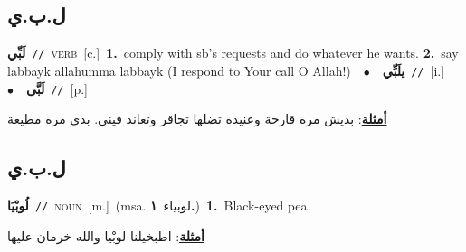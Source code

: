 \documentclass[10pt,a4paper,twoside]{article} %
\begin{document}
\begin{multicols}{2}
{{{{{{{{{{{{{\vspace{-3mm}
\subsection*{\color{blue}\foreignlanguage{arabic}{ل.ب.ي}\color{blue}{}} 

{\setlength\topsep{0pt}\textbf{\foreignlanguage{arabic}{لَبِّي}}\ {\color{gray}\texttt{//}\color{black}}\ \textsc{verb}\ [c.]\ \textbf{1.}~comply with sb's requests and do whatever he wants.  \textbf{2.}~say  labbayk allahumma labbayk (I respond to Your call O Allah!)\ \ $\bullet$\ \ \setlength\topsep{0pt}\textbf{\foreignlanguage{arabic}{يلَبِّي}}\ {\color{gray}\texttt{//}\color{black}}\ [i.]\ \ $\bullet$\ \ \setlength\topsep{0pt}\textbf{\foreignlanguage{arabic}{لَبَّى}}\ {\color{gray}\texttt{//}\color{black}}\ [p.]\  \begin{flushright}\color{gray}\foreignlanguage{arabic}{\textbf{\underline{\foreignlanguage{arabic}{أمثلة}}}: بديش مرة قارحة وعنيدة تضلها تجاقر وتعاند فيني. بدي مرة مطيعة}\end{flushright}\color{black}} \vspace{2mm}

\vspace{-3mm}
\subsection*{\color{blue}\foreignlanguage{arabic}{ل.ب.ي}\color{blue}{ (ntws)}} 

{\setlength\topsep{0pt}\textbf{\foreignlanguage{arabic}{لُوبْيَا}}\ {\color{gray}\texttt{//}\color{black}}\ \textsc{noun}\ [m.]\ \color{gray}(msa. \foreignlanguage{arabic}{لوبياء}~\foreignlanguage{arabic}{\textbf{١.}})\color{black}\ \textbf{1.}~Black-eyed pea\  \begin{flushright}\color{gray}\foreignlanguage{arabic}{\textbf{\underline{\foreignlanguage{arabic}{أمثلة}}}: اطبخيلنا لوبْيا والله خرمان عليها}\end{flushright}\color{black}} \vspace{2mm}

}}}}}}}}}}}}}
\end{multicols}
\end{document}
